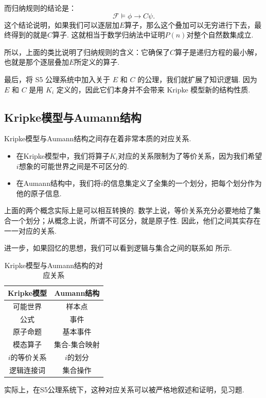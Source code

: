 而归纳规则的结论是：
\[\mathcal  F\vDash \phi\to C\psi.\]
这个结论说明，如果我们可以逐层加$E$算子，那么这个叠加可以无穷进行下去，最终得到的就是$C$算子. 这就相当于数学归纳法中证明$P(n)$对整个自然数集成立. 

所以，上面的类比说明了归纳规则的含义：它确保了$C$算子是递归方程的最小解，也就是那个逐层叠加$E$所定义的算子. 

最后，将 S5 公理系统中加入关于 $E$ 和 $C$ 的公理，我们就扩展了知识逻辑. 因为 $E$ 和 $C$ 是用 $K_i$ 定义的，因此它们本身并不会带来 Kripke 模型新的结构性质. 

\subsection{Kripke模型与Aumann结构}

Kripke模型与Aumann结构之间存在着非常本质的对应关系. 
\begin{itemize}
    \item 在Kripke模型中，我们将算子$K_i$对应的关系限制为了等价关系，因为我们希望$i$想象的可能世界之间是不可区分的. 
    \item 在Aumann结构中，我们将$i$的信息集定义了全集的一个划分，把每个划分作为他的原子信息. 
\end{itemize}

上面的两个概念实际上是可以相互转换的. 数学上说，等价关系充分必要地给了集合一个划分；从概念上说，所谓不可区分，就是原子性. 因此，他们之间其实存在一一对应的关系. 

进一步，如果回忆的思想，我们可以看到逻辑与集合之间的联系如 所示. 

\begin{table}[ht]
    \centering
    \begin{tabular}{cc}
    \toprule
    Kripke模型 & Aumann结构 \\
    \midrule
    可能世界 & 样本点 \\
    公式 & 事件 \\
    原子命题 & 基本事件 \\
    模态算子 & 集合-集合映射 \\
    $i$的等价关系 & $i$的划分 \\
    逻辑连接词 & 集合操作 \\
    \bottomrule
    \end{tabular}
    \caption{Kripke模型与Aumann结构的对应关系} \label{tab:Kripke-Aumann}
\end{table}

实际上，在S5公理系统下，这种对应关系可以被严格地叙述和证明，见习题. 

